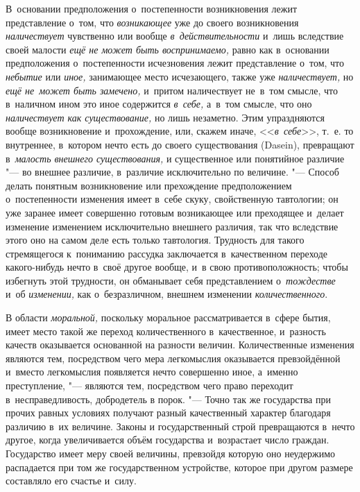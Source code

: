 В~основании предположения о~постепенности возникновения лежит представление
о~том, что {\em возникающее} уже до своего возникновения {\em наличествует}
чувственно или вообще {\em в~действительности} и~лишь вследствие своей малости
{\em ещё не может быть воспринимаемо,} равно как в~основании предположения
о~постепенности исчезновения лежит представление о~том, что {\em небытие} или
{\em иное,} занимающее место исчезающего, также уже
{\em наличествует,} но {\em ещё не~может быть замечено,} и~притом наличествует
не~в~том смысле, что в~наличном ином это иное содержится {\em в~себе,}
а~в~том смысле, что оно {\em наличествует как существование,} но лишь
незаметно. Этим упраздняются вообще возникновение и~прохождение, или, скажем
иначе, <<{\em в~себе}>>, т.~е. то внутреннее, в~котором нечто есть до своего
существования (Dasein), превращают в~{\em малость внешнего существования,} и
существенное или понятийное различие "--- во внешнее различие, в~различие
исключительно по величине. "--- Способ делать понятным возникновение или
прехождение предположением о~постепенности изменения имеет в~себе скуку,
свойственную тавтологии; он уже заранее имеет совершенно готовым возникающее
или преходящее и~делает изменение изменением исключительно внешнего различия,
так что вследствие этого оно на самом деле есть только тавтология. Трудность
для такого стремящегося к~пониманию рассудка заключается в~качественном
переходе какого-нибудь нечто в~своё другое вообще, и~в свою противоположность;
чтобы избегнуть этой трудности, он обманывает себя представлением
о~{\em тождестве} и~об {\em изменении,} как о~безразличном,
внешнем изменении {\em количественного}.

В области {\em моральной,} поскольку моральное рассматривается в~сфере бытия,
имеет место такой же переход количественного в~качественное, и~разность качеств
оказывается основанной на разности величин. Количественные изменения являются
тем, посредством чего мера легкомыслия оказывается превзойдённой и~вместо
легкомыслия появляется нечто совершенно иное, а~именно преступление, "---
являются тем, посредством чего право переходит в~несправедливость, добродетель
в порок. "--- Точно так же государства при прочих равных условиях получают
разный качественный характер благодаря различию в~их величине. Законы и
государственный строй превращаются в~нечто другое, когда увеличивается объём
государства и~возрастает число граждан. Государство имеет меру своей величины,
превзойдя которую оно неудержимо распадается при том же государственном
устройстве, которое при другом размере составляло его счастье и~силу.

